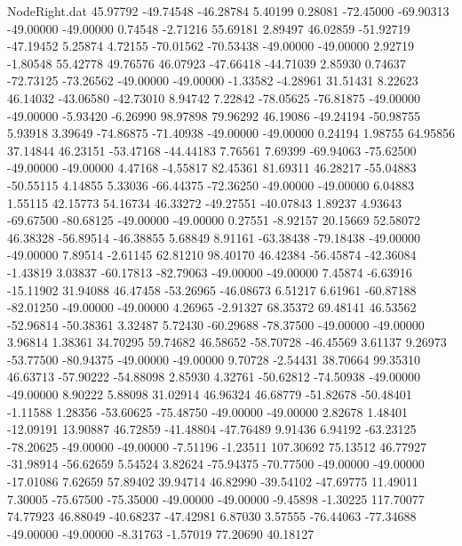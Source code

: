 \begin{filecontents}{NodeRight.dat}
  45.97792  -49.74548  -46.28784     5.40199    0.28081  -72.45000  -69.90313  -49.00000  -49.00000    0.74548   -2.71216   55.69181    2.89497
  46.02859  -51.92719  -47.19452     5.25874    4.72155  -70.01562  -70.53438  -49.00000  -49.00000    2.92719   -1.80548   55.42778   49.76576
  46.07923  -47.66418  -44.71039     2.85930    0.74637  -72.73125  -73.26562  -49.00000  -49.00000   -1.33582   -4.28961   31.51431    8.22623
  46.14032  -43.06580  -42.73010     8.94742    7.22842  -78.05625  -76.81875  -49.00000  -49.00000   -5.93420   -6.26990   98.97898   79.96292
  46.19086  -49.24194  -50.98755     5.93918    3.39649  -74.86875  -71.40938  -49.00000  -49.00000    0.24194    1.98755   64.95856   37.14844
  46.23151  -53.47168  -44.44183     7.76561    7.69399  -69.94063  -75.62500  -49.00000  -49.00000    4.47168   -4.55817   82.45361   81.69311
  46.28217  -55.04883  -50.55115     4.14855    5.33036  -66.44375  -72.36250  -49.00000  -49.00000    6.04883    1.55115   42.15773   54.16734
  46.33272  -49.27551  -40.07843     1.89237    4.93643  -69.67500  -80.68125  -49.00000  -49.00000    0.27551   -8.92157   20.15669   52.58072
  46.38328  -56.89514  -46.38855     5.68849    8.91161  -63.38438  -79.18438  -49.00000  -49.00000    7.89514   -2.61145   62.81210   98.40170
  46.42384  -56.45874  -42.36084    -1.43819    3.03837  -60.17813  -82.79063  -49.00000  -49.00000    7.45874   -6.63916  -15.11902   31.94088
  46.47458  -53.26965  -46.08673     6.51217    6.61961  -60.87188  -82.01250  -49.00000  -49.00000    4.26965   -2.91327   68.35372   69.48141
  46.53562  -52.96814  -50.38361     3.32487    5.72430  -60.29688  -78.37500  -49.00000  -49.00000    3.96814    1.38361   34.70295   59.74682
  46.58652  -58.70728  -46.45569     3.61137    9.26973  -53.77500  -80.94375  -49.00000  -49.00000    9.70728   -2.54431   38.70664   99.35310
  46.63713  -57.90222  -54.88098     2.85930    4.32761  -50.62812  -74.50938  -49.00000  -49.00000    8.90222    5.88098   31.02914   46.96324
  46.68779  -51.82678  -50.48401    -1.11588    1.28356  -53.60625  -75.48750  -49.00000  -49.00000    2.82678    1.48401  -12.09191   13.90887
  46.72859  -41.48804  -47.76489     9.91436    6.94192  -63.23125  -78.20625  -49.00000  -49.00000   -7.51196   -1.23511  107.30692   75.13512
  46.77927  -31.98914  -56.62659     5.54524    3.82624  -75.94375  -70.77500  -49.00000  -49.00000  -17.01086    7.62659   57.89402   39.94714
  46.82990  -39.54102  -47.69775    11.49011    7.30005  -75.67500  -75.35000  -49.00000  -49.00000   -9.45898   -1.30225  117.70077   74.77923
  46.88049  -40.68237  -47.42981     6.87030    3.57555  -76.44063  -77.34688  -49.00000  -49.00000   -8.31763   -1.57019   77.20690   40.18127

\end{filecontents}
